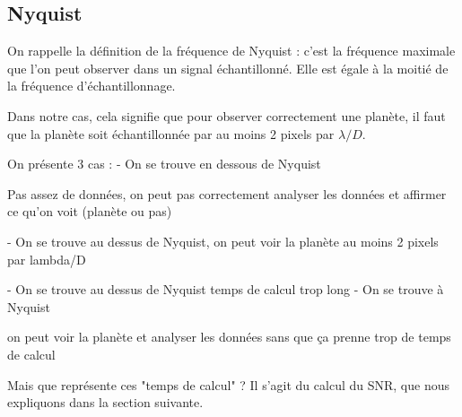 \subsection{Nyquist}

On rappelle la définition de la fréquence de Nyquist : c'est la fréquence maximale que l'on peut observer dans un signal échantillonné. Elle est égale à la moitié de la fréquence d'échantillonnage.

Dans notre cas, cela signifie que pour observer correctement une planète, il faut que la planète soit échantillonnée par au moins 2 pixels par $\lambda/D$.

On présente 3 cas :
- On se trouve en dessous de Nyquist

Pas assez de données, on peut pas correctement analyser les données et affirmer ce qu'on voit (planète ou pas)

- On se trouve au dessus de Nyquist, on peut voir la planète
au moins 2 pixels par lambda/D

- On se trouve au dessus de Nyquist
temps de calcul trop long
- On se trouve à Nyquist

on peut voir la planète et analyser les données sans que ça prenne trop de temps de calcul

Mais que représente ces "temps de calcul" ? 
Il s'agit du calcul du SNR, que nous expliquons dans la section suivante.